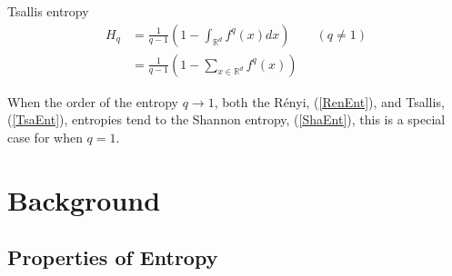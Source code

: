 \documentclass{report}
\begin{document}
Tsallis entropy
\begin{align} 
H_{q} &= \frac{1}{q-1} \left(1 - \int_{\mathbb{R}^d} f^q (x) dx \right)  \quad  \quad (q \neq 1) \label{TsaEnt} \\
&=  \frac{1}{q-1} \left(1 - \sum_{x \in \mathbb{R}^d} f^q (x) \right) \nonumber 
\end{align}

When the order of the entropy $q \to 1$, both the R\'enyi, (\ref{RenEnt}), and Tsallis, (\ref{TsaEnt}), entropies tend to the Shannon entropy, (\ref{ShaEnt}), this is a special case for when $q=1$. 



\section{Background}


\subsection{Properties of Entropy} \label{entropyProperties}
\end{document}
